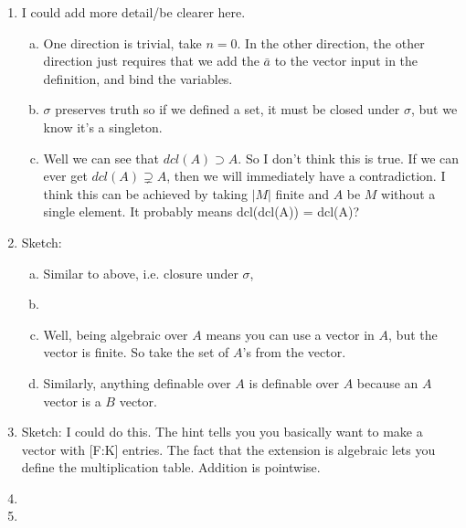 \documentclass[10pt]{article}
\begin{document}
\begin{enumerate}[1.]
\item I could add more detail/be clearer here. 
	\begin{enumerate}[a)]
	\item One direction is trivial, take $n = 0$. In the other direction, the other direction just requires that we add the $\bar{a}$ to the vector input in the definition, and bind the variables. 
	
	\item $\sigma$ preserves truth so if we defined a set, it must be closed under $\sigma$, but we know it's a singleton. 
	
	\item Well we can see that $dcl(A) \supset A$. So I don't think this is true. If we can ever get $dcl(A) \supsetneq A$, then we will immediately have a contradiction. I think this can be achieved by taking $|M|$ finite and $A$ be $M$ without a single element. It probably means dcl(dcl(A)) = dcl(A)? %
	
	\end{enumerate}

\item Sketch:
	\begin{enumerate}[a)]
	\item Similar to above, i.e. closure under $\sigma$, 
	
	\item %
	
	\item Well, being algebraic over $A$ means you can use a vector in $A$, but the vector is finite. So take the set of $A$'s from the vector. 
	
	\item Similarly, anything definable over $A$ is definable over $A$ because an $A$ vector is a $B$ vector. 
	
	\end{enumerate}
\item Sketch: I could do this. The hint tells you you basically want to make a vector with [F:K] entries. The fact that the extension is algebraic lets you define the multiplication table. Addition is pointwise. 

\item %

\item %


\end{enumerate}
\end{document}
